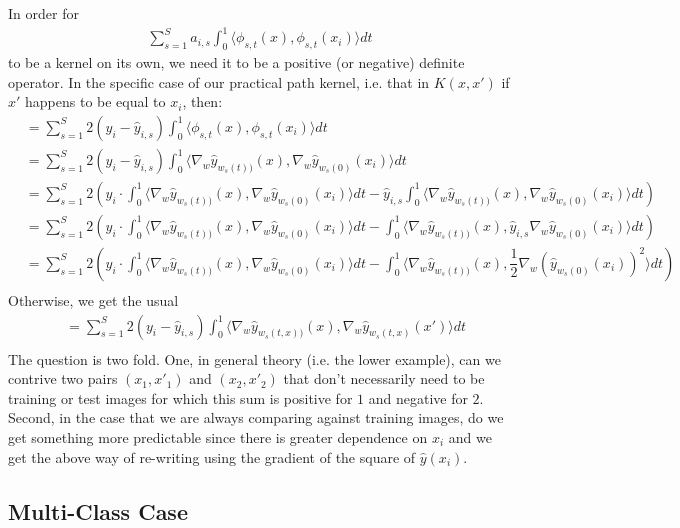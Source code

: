 In order for 
\begin{align}
    \sum_{s=1}^S a_{i,s} \int_0^1 \langle \phi_{s,t}(x), \phi_{s,t}(x_i)\rangle dt
\end{align}
to be a kernel on its own, we need it to be a positive (or negative) definite operator. In the specific case of our practical path kernel, i.e. that in $K(x,x')$ if $x'$ happens to be equal to $x_i$, then:
\begin{align}
    &= \sum_{s=1}^S 2(y_i- \hat y_{i, s}) \int_0^1 \langle \phi_{s,t}(x), \phi_{s,t}(x_i)\rangle dt\\
    &= \sum_{s=1}^S 2(y_i- \hat y_{i, s}) \int_0^1 \langle \nabla_w \hat y_{w_s(t))} (x), \nabla_w \hat y_{w_s(0)} (x_i)\rangle dt\\
    &= \sum_{s=1}^S 2 \left(y_i \cdot \int_0^1 \langle \nabla_w \hat y_{w_s(t))} (x), \nabla_w \hat y_{w_s(0)} (x_i)\rangle dt - \hat y_{i, s} \int_0^1 \langle \nabla_w \hat y_{w_s(t))} (x), \nabla_w \hat y_{w_s(0)} (x_i)\rangle dt \right)\\
    &= \sum_{s=1}^S 2 \left(y_i \cdot \int_0^1 \langle \nabla_w \hat y_{w_s(t))} (x), \nabla_w \hat y_{w_s(0)} (x_i)\rangle dt -  \int_0^1 \langle \nabla_w \hat y_{w_s(t))} (x), \hat y_{i, s} \nabla_w \hat y_{w_s(0)} (x_i)\rangle dt \right)\\
    &= \sum_{s=1}^S 2 \left(y_i \cdot \int_0^1 \langle \nabla_w \hat y_{w_s(t))} (x), \nabla_w \hat y_{w_s(0)} (x_i)\rangle dt -  \int_0^1 \langle \nabla_w \hat y_{w_s(t))} (x), \dfrac{1}{2}\nabla_w (\hat y_{w_s(0)} (x_i))^2\rangle dt \right)\\
\end{align}
Otherwise, we get the usual 
\begin{align}
        &= \sum_{s=1}^S 2(y_i- \hat y_{i, s}) \int_0^1 \langle \nabla_w \hat y_{w_s(t,x))} (x), \nabla_w \hat y_{w_s(t,x)} (x')\rangle dt\\
\end{align}
The question is two fold. One, in general theory (i.e. the lower example), can we contrive two pairs $(x_1,x'_1)$ and $(x_2,x'_2)$ that don't necessarily need to be training or test images for which this sum is positive for $1$ and negative for $2$. Second, in the case that we are always comparing against training images, do we get something more predictable since there is greater dependence on $x_i$ and we get the above way of re-writing  using the gradient of the square of $\hat y(x_i)$. 


\subsection{Multi-Class Case}

